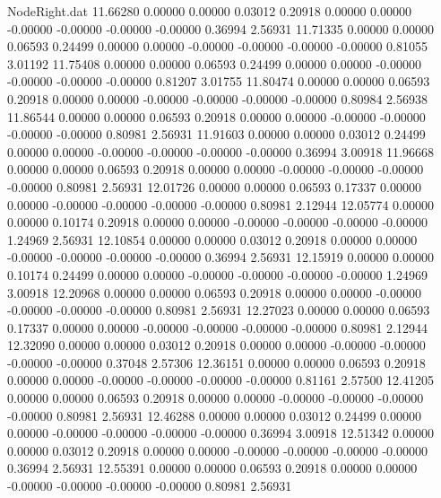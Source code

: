 \begin{filecontents}{NodeRight.dat}
  11.66280    0.00000    0.00000     0.03012    0.20918    0.00000    0.00000   -0.00000   -0.00000   -0.00000   -0.00000    0.36994    2.56931
  11.71335    0.00000    0.00000     0.06593    0.24499    0.00000    0.00000   -0.00000   -0.00000   -0.00000   -0.00000    0.81055    3.01192
  11.75408    0.00000    0.00000     0.06593    0.24499    0.00000    0.00000   -0.00000   -0.00000   -0.00000   -0.00000    0.81207    3.01755
  11.80474    0.00000    0.00000     0.06593    0.20918    0.00000    0.00000   -0.00000   -0.00000   -0.00000   -0.00000    0.80984    2.56938
  11.86544    0.00000    0.00000     0.06593    0.20918    0.00000    0.00000   -0.00000   -0.00000   -0.00000   -0.00000    0.80981    2.56931
  11.91603    0.00000    0.00000     0.03012    0.24499    0.00000    0.00000   -0.00000   -0.00000   -0.00000   -0.00000    0.36994    3.00918
  11.96668    0.00000    0.00000     0.06593    0.20918    0.00000    0.00000   -0.00000   -0.00000   -0.00000   -0.00000    0.80981    2.56931
  12.01726    0.00000    0.00000     0.06593    0.17337    0.00000    0.00000   -0.00000   -0.00000   -0.00000   -0.00000    0.80981    2.12944
  12.05774    0.00000    0.00000     0.10174    0.20918    0.00000    0.00000   -0.00000   -0.00000   -0.00000   -0.00000    1.24969    2.56931
  12.10854    0.00000    0.00000     0.03012    0.20918    0.00000    0.00000   -0.00000   -0.00000   -0.00000   -0.00000    0.36994    2.56931
  12.15919    0.00000    0.00000     0.10174    0.24499    0.00000    0.00000   -0.00000   -0.00000   -0.00000   -0.00000    1.24969    3.00918
  12.20968    0.00000    0.00000     0.06593    0.20918    0.00000    0.00000   -0.00000   -0.00000   -0.00000   -0.00000    0.80981    2.56931
  12.27023    0.00000    0.00000     0.06593    0.17337    0.00000    0.00000   -0.00000   -0.00000   -0.00000   -0.00000    0.80981    2.12944
  12.32090    0.00000    0.00000     0.03012    0.20918    0.00000    0.00000   -0.00000   -0.00000   -0.00000   -0.00000    0.37048    2.57306
  12.36151    0.00000    0.00000     0.06593    0.20918    0.00000    0.00000   -0.00000   -0.00000   -0.00000   -0.00000    0.81161    2.57500
  12.41205    0.00000    0.00000     0.06593    0.20918    0.00000    0.00000   -0.00000   -0.00000   -0.00000   -0.00000    0.80981    2.56931
  12.46288    0.00000    0.00000     0.03012    0.24499    0.00000    0.00000   -0.00000   -0.00000   -0.00000   -0.00000    0.36994    3.00918
  12.51342    0.00000    0.00000     0.03012    0.20918    0.00000    0.00000   -0.00000   -0.00000   -0.00000   -0.00000    0.36994    2.56931
  12.55391    0.00000    0.00000     0.06593    0.20918    0.00000    0.00000   -0.00000   -0.00000   -0.00000   -0.00000    0.80981    2.56931

\end{filecontents}
